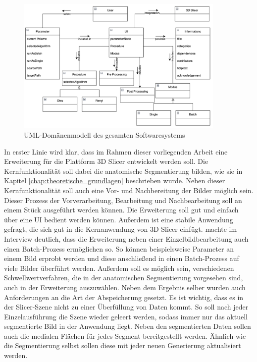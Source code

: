 \begin{figure}[h]
	\centering
	\includegraphics[width=0.9\textwidth]{img/domaene.png}
	\caption{UML-Domänenmodell des gesamten Softwaresystems}
	\label{fig:3d_slicer_domäne}
\end{figure}

In erster Linie wird klar, dass im Rahmen dieser vorliegenden Arbeit eine
Erweiterung für die Plattform 3D Slicer entwickelt werden soll. Die Kernfunktionalität
soll dabei die anatomische Segmentierung bilden, wie sie in Kapitel
\ref{chap:theoretische_grundlagen} beschrieben wurde. Neben dieser Kernfunktionalität
soll auch eine Vor- und Nachbereitung der Bilder möglich sein. Dieser Prozess der
Vorverarbeitung, Bearbeitung und Nachbearbeitung soll an einem Stück ausgeführt
werden können. Die Erweiterung soll gut und einfach über eine \ac{UI} bedient
werden können. Außerdem ist eine stabile Anwendung gefragt, die sich gut in die
Kernanwendung von 3D Slicer einfügt. \citet[]{walter2025} machte im Interview
deutlich, dass die Erweiterung neben einer Einzelbildbearbeitung auch einen Batch-Prozess
ermöglichen so. So können beispielsweise Parameter an einem Bild erprobt werden
und diese anschließend in einen Batch-Prozess auf viele Bilder überführt werden.
Außerdem soll es möglich sein, verschiedenen Schwellwertverfahren, die in der anatomischen
Segmentierung vorgesehen sind, auch in der Erweiterung auszuwählen. Neben dem Ergebnis
selber wurden auch Anforderungen an die Art der Abspeicherung gesetzt. Es ist
wichtig, dass es in der Slicer-Szene nicht zu einer Überfüllung von Daten kommt.
So soll nach jeder Einzelausführung die Szene wieder geleert werden, sodass immer
nur das aktuell segmentierte Bild in der Anwendung liegt. Neben den
segmentierten Daten sollen auch die medialen Flächen für jedes Segment
bereitgestellt werden. Ähnlich wie die Segmentierung selbst sollen diese mit jeder
neuen Generierung aktualisiert werden.

